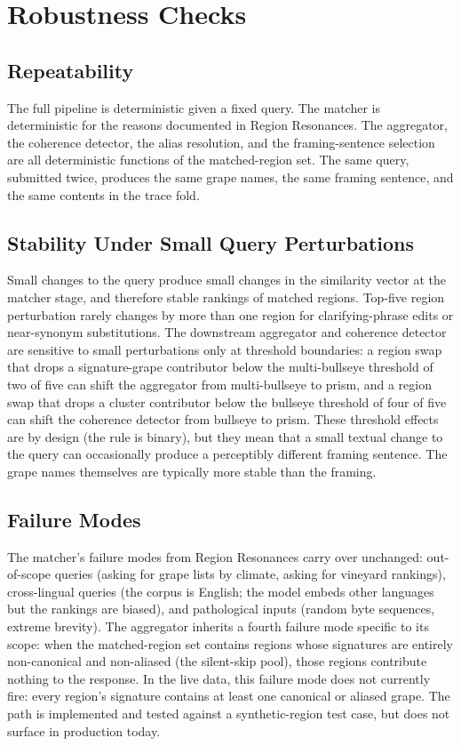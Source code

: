 \documentclass[11pt]{article}
\begin{document}
\section{Robustness Checks}

\subsection{Repeatability}
The full pipeline is deterministic given a fixed query. The matcher is deterministic for the reasons documented in Region Resonances. The aggregator, the coherence detector, the alias resolution, and the framing-sentence selection are all deterministic functions of the matched-region set. The same query, submitted twice, produces the same grape names, the same framing sentence, and the same contents in the trace fold.

\subsection{Stability Under Small Query Perturbations}
Small changes to the query produce small changes in the similarity vector at the matcher stage, and therefore stable rankings of matched regions. Top-five region perturbation rarely changes by more than one region for clarifying-phrase edits or near-synonym substitutions. The downstream aggregator and coherence detector are sensitive to small perturbations only at threshold boundaries: a region swap that drops a signature-grape contributor below the multi-bullseye threshold of two of five can shift the aggregator from multi-bullseye to prism, and a region swap that drops a cluster contributor below the bullseye threshold of four of five can shift the coherence detector from bullseye to prism. These threshold effects are by design (the rule is binary), but they mean that a small textual change to the query can occasionally produce a perceptibly different framing sentence. The grape names themselves are typically more stable than the framing.

\subsection{Failure Modes}
The matcher's failure modes from Region Resonances carry over unchanged: out-of-scope queries (asking for grape lists by climate, asking for vineyard rankings), cross-lingual queries (the corpus is English; the model embeds other languages but the rankings are biased), and pathological inputs (random byte sequences, extreme brevity). The aggregator inherits a fourth failure mode specific to its scope: when the matched-region set contains regions whose signatures are entirely non-canonical and non-aliased (the silent-skip pool), those regions contribute nothing to the response. In the live data, this failure mode does not currently fire: every region's signature contains at least one canonical or aliased grape. The path is implemented and tested against a synthetic-region test case, but does not surface in production today.
\end{document}
